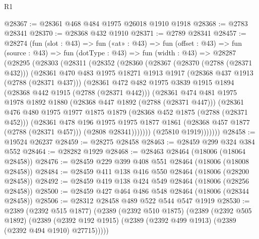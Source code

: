 \begin{lexlean}{R1}
\begin{coremodule}
@28367 := @28361 @468 @484 @1975 @26018 @1910 @1918
@28368 := @2783 @28341
@28370 := @28368 @432 @1910
@28371 := @2789 @28341
@28457 := @28274
    (fun (slot : @43) =>
    fun («at» : @43) =>
    fun (offset : @43) =>
    fun (source : @43) =>
    fun (dotType : @43) =>
    fun (width : @43) =>
    @28287
      (@28295
        (@28303
          (@28311
            (@28352
              (@28360
                (@28367
                  (@28370 (@2788 (@28371 @432)))
                  (@28361
                    @470
                    @483
                    @1975
                    @18271
                    @1913
                    @1917
                    (@28368 @437 @1913 (@2788 (@28371 @437)))
                    (@28361
                      @472
                      @482
                      @1975
                      @3839
                      @1915
                      @1894
                      (@28368 @442 @1915 (@2788 (@28371 @442)))
                      (@28361
                        @474
                        @481
                        @1975
                        @1978
                        @1892
                        @1880
                        (@28368 @447 @1892 (@2788 (@28371 @447)))
                        (@28361
                          @476
                          @480
                          @1975
                          @1977
                          @1875
                          @1879
                          (@28368 @452 @1875 (@2788 (@28371 @452)))
                          (@28361
                            @478
                            @196
                            @1975
                            @1975
                            @1877
                            @1861
                            (@28368 @457 @1877 (@2788 (@28371 @457)))
                            (@2808 @28341)))))))
                (@25810 @1919)))))))
@28458 := @19524 @26237
@28459 := @28275 @28458
@28463 := @28459 @299 @324 @384 @552
@28464 := @28282 @1929
@28468 := @28463 @28464 (@18006 (@18064 @28458))
@28476 := @28459 @229 @399 @408 @551 @28464 (@18006 (@18008 @28458))
@28484 := @28459 @411 @138 @416 @550 @28464 (@18006 (@28200 @28458))
@28492 := @28459 @419 @138 @424 @549 @28464 (@18006 (@28256 @28458))
@28500 := @28459 @427 @464 @486 @548 @28464 (@18006 (@28344 @28458))
@28506 := @28312 @28458 @489 @522 @544 @547 @1919
@28530 := @2389
    (@2392 @515 @1877)
    (@2389
      (@2392 @510 @1875)
      (@2389
        (@2392 @505 @1892)
        (@2389 (@2392 @192 @1915) (@2389 (@2392 @499 @1913) (@2389 (@2392 @494 @1910) @27715)))))

\end{coremodule}
\end{lexlean}
